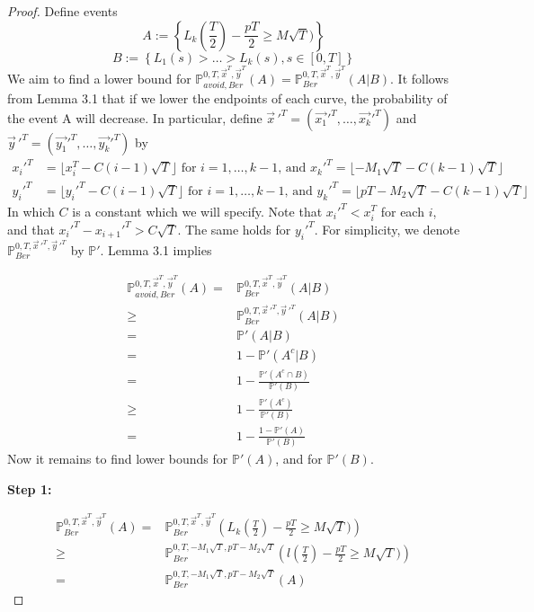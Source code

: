 \documentclass[12pt]{article}
\begin{document}
\begin{proof}
Define events
$$ A:=\left\{ L_k\left(\frac{T}{2}\right)-\frac{pT}{2} \geq M\sqrt{T}) \right\}$$
$$ B:=\left\{ L_1(s)>\dots>L_k(s) , s \in [0,T]\right\}$$
We aim to find a lower bound for $\mathbb{P}_{avoid, Ber}^{0,T, \vec{x}^T, \vec{y}^T} (A)
= \mathbb{P}_{Ber}^{0,T, \vec{x}^T, \vec{y}^T}  (A|B)$.
It follows from Lemma 3.1 that if we lower the endpoints of each curve, the probability of the event A will decrease. 
In particular, define $\vec{x}\,'^T = (\vec{x_1}'^T,\dots,\vec{x_k}'^T)$ and $\vec{y}\,'^T = (\vec{y_1}'^T,\dots,\vec{y_k}'^T)$ by
\begin{align*}
x_i'^T &= \lfloor x_i^T - C(i-1)\sqrt{T} \rfloor  \text{ for } i=1,\dots,k-1\text{, and } x_k'^T= \lfloor -M_1\sqrt{T} - C(k-1)\sqrt{T} \rfloor\\
y_i'^T &= \lfloor y_i'^T-C(i-1)\sqrt{T} \rfloor \text{ for } i=1,\dots,k-1\text{, and }y_k'^T= \lfloor pT-M_2\sqrt{T} - C(k-1)\sqrt{T} \rfloor
\end{align*}
In which $C$ is a constant which we will specify. Note that $x_i'^T < x_i^T$ for each $i$, and that $x_i'^T-x_{i+1}'^T>C\sqrt{T}$. The same holds for $y_i'^T$. For simplicity, we denote $ \mathbb{P}_{Ber}^{0,T, \vec{x}\,'^T, \vec{y}\,'^T}$ by $\mathbb{P'}$. Lemma 3.1 implies

\begin{align*}
\mathbb{P}_{avoid, Ber}^{0,T, \vec{x}^T, \vec{y}^T}(A) 
=& \mathbb{P}_{Ber}^{0,T, \vec{x}^T, \vec{y}^T}(A|B) \\
\geq& \mathbb{P}_{Ber}^{0,T, \vec{x}\,'^T, \vec{y}\,'^T}(A|B) \\
=& \mathbb{P'}(A|B)\\
=& 1 -  \mathbb{P'}(A^c|B)\\
=& 1 -  \frac{\mathbb{P'}(A^c\cap B)}{\mathbb{P'}(B)} \\
\geq& 1 -  \frac{\mathbb{P'}(A^c)}{\mathbb{P'}(B)} \\
=&  1 -  \frac{1-\mathbb{P'}(A)}{\mathbb{P'}(B)}
\end{align*}
Now it remains to find lower bounds for $\mathbb{P'}(A)$, and for $\mathbb{P'}(B)$.


\noindent\textbf{Step 1:} 

\begin{align*}
\mathbb{P}_{Ber}^{0,T, \vec{x}^T, \vec{y}^T}(A)
= & \mathbb{P}_{Ber}^{0,T, \vec{x}^T, \vec{y}^T} \left(L_k\left(\frac{T}{2}\right)-\frac{pT}{2} \geq M\sqrt{T}) \right) \\
\geq & \mathbb{P}_{Ber}^{0,T, -M_1\sqrt{T},pT-M_2\sqrt{T}}\left(l\left(\frac{T}{2}\right)-\frac{pT}{2} \geq M\sqrt{T}) \right) \\
= & \mathbb{P}_{Ber}^{0,T, -M_1\sqrt{T},pT-M_2\sqrt{T}}(A)
\end{align*}




	
\end{proof}
\end{document}
